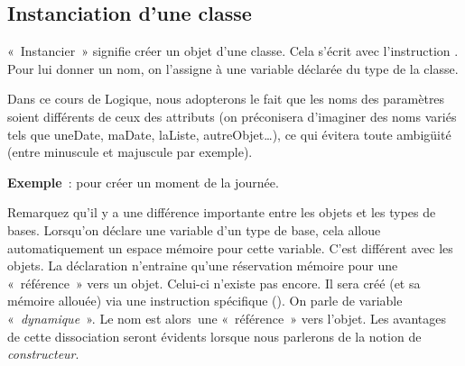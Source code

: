 	\subsection{Instanciation d'une classe}
	
		«~Instancier~» signifie créer un objet d'une classe.
		Cela s'écrit avec l'instruction
		. 
		Pour lui donner un nom, 
		on l'assigne à une variable déclarée du type de la
		classe.


		Dans ce cours de Logique, nous adopterons le fait que 
		les noms des paramètres soient différents de ceux des 
		attributs (on préconisera d’imaginer des noms variés tels 
		que uneDate, maDate, laListe, autreObjet…), ce qui évitera 
		toute ambigüité (entre minuscule et majuscule par exemple).

		\textbf{Exemple}~: pour créer un moment de la journée.
		

		Remarquez qu'il y a une différence importante entre les
		objets et les types de bases. Lorsqu'on déclare une
		variable d'un type de base, cela alloue
		automatiquement un espace mémoire pour cette variable.
		C'est différent avec les objets. La déclaration
		n'entraine qu'une réservation mémoire
		pour une «~référence~» vers un objet. Celui-ci
		n'existe pas encore. Il sera créé (et sa mémoire
		allouée) via une instruction spécifique (). On
		parle de variable «\textit{~dynamique~}». Le nom est alors~une
		«~référence~» vers l’objet. Les avantages de cette dissociation seront
		évidents lorsque nous parlerons de la notion de \textit{constructeur}.

